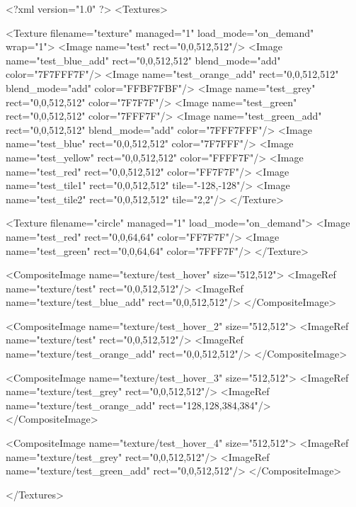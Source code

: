 <?xml version="1.0" ?>
<Textures>

	<Texture filename="texture" managed="1" load_mode="on_demand" wrap="1">
		<Image name="test" rect="0,0,512,512"/>
		<Image name="test_blue_add" rect="0,0,512,512" blend_mode="add" color="7F7FFF7F"/>
		<Image name="test_orange_add" rect="0,0,512,512" blend_mode="add" color="FFBF7FBF"/>
		<Image name="test_grey" rect="0,0,512,512" color="7F7F7F"/>
		<Image name="test_green" rect="0,0,512,512" color="7FFF7F"/>
		<Image name="test_green_add" rect="0,0,512,512" blend_mode="add" color="7FFF7FFF"/>
		<Image name="test_blue" rect="0,0,512,512" color="7F7FFF"/>
		<Image name="test_yellow" rect="0,0,512,512" color="FFFF7F"/>
		<Image name="test_red" rect="0,0,512,512" color="FF7F7F"/>
		<Image name="test_tile1" rect="0,0,512,512" tile="-128,-128"/>
		<Image name="test_tile2" rect="0,0,512,512" tile="2,2"/>
	</Texture>
	
	<Texture filename="circle" managed="1" load_mode="on_demand">
		<Image name="test_red" rect="0,0,64,64" color="FF7F7F"/>
		<Image name="test_green" rect="0,0,64,64" color="7FFF7F"/>
	</Texture>
	
	<CompositeImage name="texture/test_hover" size="512,512">
		<ImageRef name="texture/test" rect="0,0,512,512"/>
		<ImageRef name="texture/test_blue_add" rect="0,0,512,512"/>
	</CompositeImage>
	
	<CompositeImage name="texture/test_hover_2" size="512,512">
		<ImageRef name="texture/test" rect="0,0,512,512"/>
		<ImageRef name="texture/test_orange_add" rect="0,0,512,512"/>
	</CompositeImage>
	
	<CompositeImage name="texture/test_hover_3" size="512,512">
		<ImageRef name="texture/test_grey" rect="0,0,512,512"/>
		<ImageRef name="texture/test_orange_add" rect="128,128,384,384"/>
	</CompositeImage>
	
	<CompositeImage name="texture/test_hover_4" size="512,512">
		<ImageRef name="texture/test_grey" rect="0,0,512,512"/>
		<ImageRef name="texture/test_green_add" rect="0,0,512,512"/>
	</CompositeImage>
	
</Textures>
